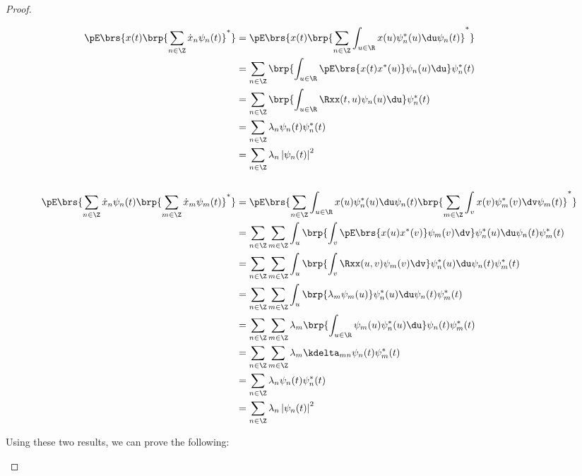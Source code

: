 \begin{proof}
\begin{enumerate}
\begin{align*}
   \pE\brs{x(t) \brp{\sum_{n\in\Z}\dot{x}_n \psi_n(t)}^\ast}
     &= \pE\brs{x(t) \brp{\sum_{n\in\Z}\int_{u\in\R}x(u)\psi_n^\ast(u)\du \psi_n(t)}^\ast}
   \\&= \sum_{n\in\Z}\brp{\int_{u\in\R}\pE\brs{x(t)x^\ast(u)}\psi_n(u)\du} \psi_n^\ast(t)
   \\&= \sum_{n\in\Z}\brp{\int_{u\in\R}\Rxx(t,u)\psi_n(u)\du} \psi_n^\ast(t)
   \\&= \sum_{n\in\Z}\lambda_n\psi_n(t) \psi_n^\ast(t)
   \\&= \sum_{n\in\Z}\lambda_n \left|\psi_n(t) \right|^2
\\ \\
   \pE\brs{\sum_{n\in\Z}\dot{x}_n \psi_n(t)\brp{\sum_{m\in\Z}\dot{x}_m \psi_m(t)}^\ast}
     &= \pE\brs{\sum_{n\in\Z}\int_{u\in\R}x(u)\psi_n^\ast(u)\du   \psi_n(t)\brp{\sum_{m\in\Z}\int_v x(v)\psi_m^\ast(v)\dv \psi_m(t)}^\ast}
   \\&= \sum_{n\in\Z}\sum_{m\in\Z}\int_u\brp{\int_v \pE\brs{x(u)x^\ast(v)}\psi_m(v)\dv} \psi_n^\ast(u)\du   \psi_n(t)   \psi_m^\ast(t)
   \\&= \sum_{n\in\Z}\sum_{m\in\Z}\int_u\brp{\int_v \Rxx(u,v)\psi_m(v)\dv} \psi_n^\ast(u)\du   \psi_n(t)   \psi_m^\ast(t)
   \\&= \sum_{n\in\Z}\sum_{m\in\Z}\int_u\brp{\lambda_m\psi_m(u)} \psi_n^\ast(u)\du   \psi_n(t)   \psi_m^\ast(t)
   \\&= \sum_{n\in\Z}\sum_{m\in\Z}\lambda_m \brp{\int_{u\in\R}\psi_m(u) \psi_n^\ast(u)\du }   \psi_n(t)   \psi_m^\ast(t)
   \\&= \sum_{n\in\Z}\sum_{m\in\Z}\lambda_m \kdelta_{mn}   \psi_n(t)   \psi_m^\ast(t)
   \\&= \sum_{n\in\Z}\lambda_n   \psi_n(t)   \psi_n^\ast(t)
   \\&= \sum_{n\in\Z}\lambda_n  \left| \psi_n(t) \right|^2
\end{align*}


Using these two results, we can prove the following:


\end{enumerate}
\end{proof}
